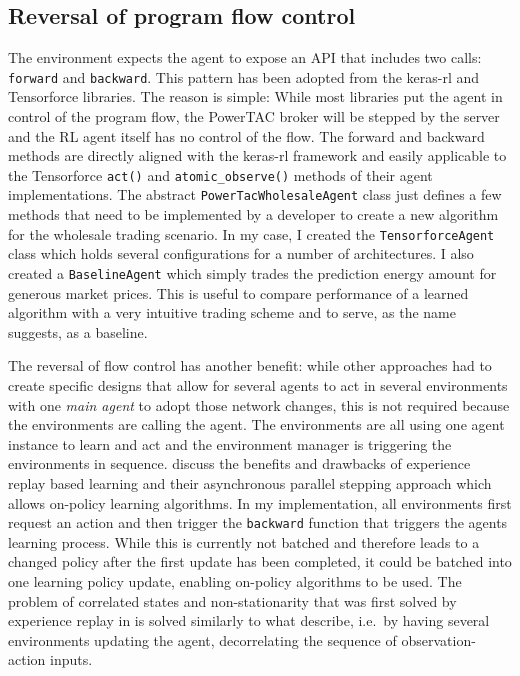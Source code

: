 \subsection{Reversal of program flow control}%
\label{sub:reversal_of_flow_control}

The environment expects the agent to expose an \ac{API} that includes two calls: \texttt{forward} and
\texttt{backward}. This pattern has been adopted from the keras-rl and Tensorforce libraries. The reason is simple:
While most libraries put the agent in control of the program flow, the \ac{PowerTAC} broker will be stepped by the
server and the \ac{RL} agent itself has no control of the flow. The forward and backward methods are
directly aligned with the keras-rl framework and easily applicable to the Tensorforce \texttt{act()} and
\texttt{atomic\_observe()} methods of their agent implementations. The abstract \texttt{PowerTacWholesaleAgent} class just defines a
few methods that need to be implemented by a developer to create a new algorithm for the wholesale trading
scenario. In my case, I created the \texttt{TensorforceAgent} class which holds several configurations for a number of
architectures. I also created a \texttt{BaselineAgent} which simply trades the prediction energy amount for generous
market prices. This is useful to compare performance of a learned algorithm with a very intuitive trading scheme and to
serve, as the name suggests, as a baseline.

The reversal of flow control has another benefit: while other approaches had to create specific designs that allow for
several agents to act in several environments with one \emph{main agent} to adopt those network changes, this is not
required because the environments are calling the agent. The environments are all using one agent instance to learn and
act and the environment manager is triggering the environments in sequence. \citet{mnih2016asynchronous} discuss the
benefits and drawbacks of experience replay based learning and their asynchronous parallel stepping approach which
allows on-policy learning algorithms. In my implementation, all environments first request an action and then trigger
the \texttt{backward} function that triggers the agents learning process. While this is currently not batched and
therefore leads to a changed policy after the first update has been completed, it could be batched into
one learning policy update, enabling on-policy algorithms to be used. The problem of correlated states and
non-stationarity that was first solved by experience replay in \cite[]{mnih2013playing} is solved similarly to what
\citet{mnih2016asynchronous} describe, i.e.\ by having several environments updating the agent, decorrelating the
sequence of observation-action inputs.

